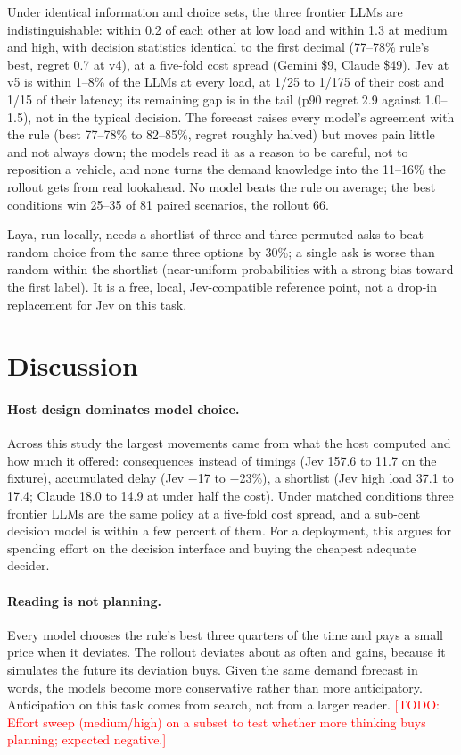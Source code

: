 \documentclass[11pt]{article}
\newcommand{\todo}[1]{\textcolor{red}{[TODO: #1]}}
\begin{document}
Under identical information and choice sets, the three frontier LLMs are indistinguishable: within 0.2 of each other at low load and within 1.3 at medium and high, with decision statistics identical to the first decimal (77--78\% rule's best, regret 0.7 at v4), at a five-fold cost spread (Gemini \$9, Claude \$49). Jev at v5 is within 1--8\% of the LLMs at every load, at 1/25 to 1/175 of their cost and 1/15 of their latency; its remaining gap is in the tail (p90 regret 2.9 against 1.0--1.5), not in the typical decision. The forecast raises every model's agreement with the rule (best 77--78\% to 82--85\%, regret roughly halved) but moves pain little and not always down; the models read it as a reason to be careful, not to reposition a vehicle, and none turns the demand knowledge into the 11--16\% the rollout gets from real lookahead. No model beats the rule on average; the best conditions win 25--35 of 81 paired scenarios, the rollout 66.

Laya, run locally, needs a shortlist of three and three permuted asks to beat random choice from the same three options by 30\%; a single ask is worse than random within the shortlist (near-uniform probabilities with a strong bias toward the first label). It is a free, local, Jev-compatible reference point, not a drop-in replacement for Jev on this task.

\section{Discussion}
\label{sec:discussion}
\paragraph{Host design dominates model choice.} Across this study the largest movements came from what the host computed and how much it offered: consequences instead of timings (Jev 157.6 to 11.7 on the fixture), accumulated delay (Jev $-$17 to $-$23\%), a shortlist (Jev high load 37.1 to 17.4; Claude 18.0 to 14.9 at under half the cost). Under matched conditions three frontier LLMs are the same policy at a five-fold cost spread, and a sub-cent decision model is within a few percent of them. For a deployment, this argues for spending effort on the decision interface and buying the cheapest adequate decider.

\paragraph{Reading is not planning.} Every model chooses the rule's best three quarters of the time and pays a small price when it deviates. The rollout deviates about as often and gains, because it simulates the future its deviation buys. Given the same demand forecast in words, the models become more conservative rather than more anticipatory. Anticipation on this task comes from search, not from a larger reader. \todo{Effort sweep (medium/high) on a subset to test whether more thinking buys planning; expected negative.}
\end{document}
